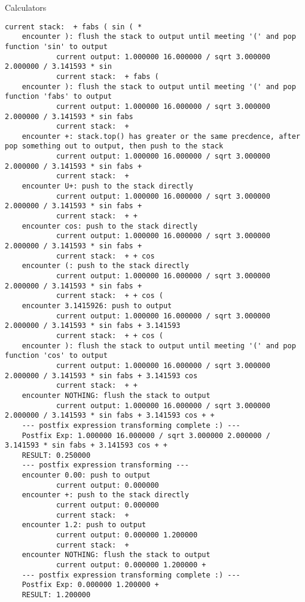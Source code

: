 \begin{homeworkProblem}{Calculators}
\begin{lstlisting}[breaklines=true]
            current stack:  + fabs ( sin ( *
    encounter ): flush the stack to output until meeting '(' and pop function 'sin' to output
            current output: 1.000000 16.000000 / sqrt 3.000000 2.000000 / 3.141593 * sin
            current stack:  + fabs (
    encounter ): flush the stack to output until meeting '(' and pop function 'fabs' to output
            current output: 1.000000 16.000000 / sqrt 3.000000 2.000000 / 3.141593 * sin fabs
            current stack:  +
    encounter +: stack.top() has greater or the same precdence, after pop something out to output, then push to the stack
            current output: 1.000000 16.000000 / sqrt 3.000000 2.000000 / 3.141593 * sin fabs +
            current stack:  +
    encounter U+: push to the stack directly
            current output: 1.000000 16.000000 / sqrt 3.000000 2.000000 / 3.141593 * sin fabs +
            current stack:  + +
    encounter cos: push to the stack directly
            current output: 1.000000 16.000000 / sqrt 3.000000 2.000000 / 3.141593 * sin fabs +
            current stack:  + + cos
    encounter (: push to the stack directly
            current output: 1.000000 16.000000 / sqrt 3.000000 2.000000 / 3.141593 * sin fabs +
            current stack:  + + cos (
    encounter 3.1415926: push to output
            current output: 1.000000 16.000000 / sqrt 3.000000 2.000000 / 3.141593 * sin fabs + 3.141593
            current stack:  + + cos (
    encounter ): flush the stack to output until meeting '(' and pop function 'cos' to output
            current output: 1.000000 16.000000 / sqrt 3.000000 2.000000 / 3.141593 * sin fabs + 3.141593 cos
            current stack:  + +
    encounter NOTHING: flush the stack to output
            current output: 1.000000 16.000000 / sqrt 3.000000 2.000000 / 3.141593 * sin fabs + 3.141593 cos + +
    --- postfix expression transforming complete :) ---
    Postfix Exp: 1.000000 16.000000 / sqrt 3.000000 2.000000 / 3.141593 * sin fabs + 3.141593 cos + +
    RESULT: 0.250000
    --- postfix expression transforming ---
    encounter 0.00: push to output
            current output: 0.000000
    encounter +: push to the stack directly
            current output: 0.000000
            current stack:  +
    encounter 1.2: push to output
            current output: 0.000000 1.200000
            current stack:  +
    encounter NOTHING: flush the stack to output
            current output: 0.000000 1.200000 +
    --- postfix expression transforming complete :) ---
    Postfix Exp: 0.000000 1.200000 +
    RESULT: 1.200000
    \end{lstlisting}

\end{homeworkProblem}


